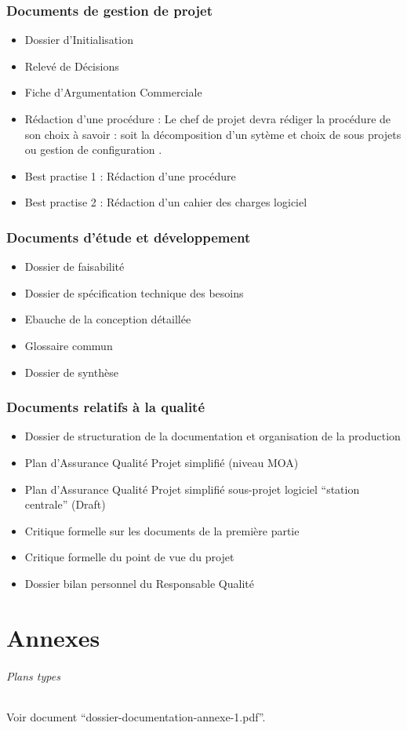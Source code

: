 \documentclass[a4paper]{article}
\begin{document}
\section{Documents de gestion de projet}

\begin{itemize}
\item Dossier d'Initialisation
\item Relevé de Décisions
\item Fiche d'Argumentation Commerciale 
\item Rédaction d'une procédure : Le chef de projet devra rédiger la procédure de son choix à savoir : soit la \og décomposition d'un sytème et choix de sous projets \fg ou \og gestion de configuration \fg.
\item Best practise 1 : Rédaction d'une procédure
\item Best practise 2 : Rédaction d'un cahier des charges logiciel
\end{itemize}


\section{Documents d’étude et développement}

\begin{itemize}
\item Dossier de faisabilité
\item Dossier de spécification technique des besoins
\item Ebauche de la conception détaillée
\item Glossaire commun
\item Dossier de synthèse
\end{itemize}

\section{Documents relatifs à la qualité}

\begin{itemize}
\item Dossier de structuration de la documentation et organisation de la production
\item Plan d'Assurance Qualité Projet simplifié (niveau MOA)
\item Plan d'Assurance Qualité Projet simplifié sous-projet logiciel ``station centrale'' (Draft)
\item Critique formelle sur les documents de la première partie
\item Critique formelle du point de vue du projet
\item Dossier bilan personnel du Responsable Qualité
\end{itemize}

\part{Annexes}

\paragraph{Plans types} Voir document ``dossier-documentation-annexe-1.pdf''.
\end{document}
